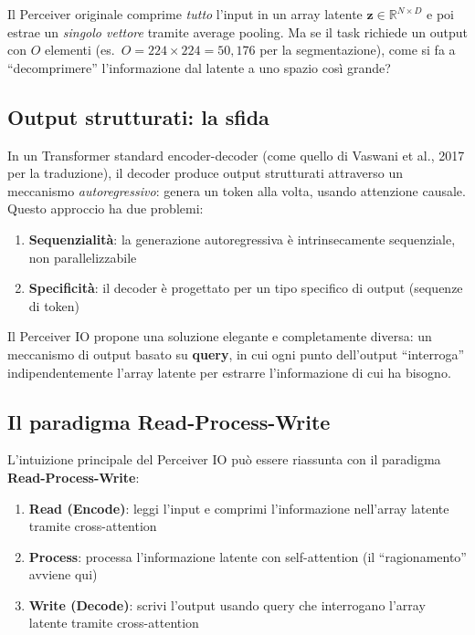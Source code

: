 \documentclass[12pt,a4paper]{article}
\begin{document}
\begin{notabox}
Il Perceiver originale comprime \emph{tutto} l'input in un array latente $\mathbf{z} \in \mathbb{R}^{N \times D}$ e poi estrae un \emph{singolo vettore} tramite average pooling. Ma se il task richiede un output con $O$ elementi (es.\ $O = 224 \times 224 = 50{,}176$ per la segmentazione), come si fa a ``decomprimere'' l'informazione dal latente a uno spazio cos\`i grande?
\end{notabox}

\subsection{Output strutturati: la sfida}

In un Transformer standard encoder-decoder (come quello di Vaswani et al., 2017 per la traduzione), il decoder produce output strutturati attraverso un meccanismo \emph{autoregressivo}: genera un token alla volta, usando attenzione causale. Questo approccio ha due problemi:

\begin{enumerate}
    \item \textbf{Sequenzialit\`a}: la generazione autoregressiva \`e intrinsecamente sequenziale, non parallelizzabile
    \item \textbf{Specificit\`a}: il decoder \`e progettato per un tipo specifico di output (sequenze di token)
\end{enumerate}

Il Perceiver IO propone una soluzione elegante e completamente diversa: un meccanismo di output basato su \textbf{query}, in cui ogni punto dell'output ``interroga'' indipendentemente l'array latente per estrarre l'informazione di cui ha bisogno.

\subsection{Il paradigma Read-Process-Write}

L'intuizione principale del Perceiver IO pu\`o essere riassunta con il paradigma \textbf{Read-Process-Write}:

\begin{enumerate}
    \item \textbf{Read (Encode)}: leggi l'input e comprimi l'informazione nell'array latente tramite cross-attention
    \item \textbf{Process}: processa l'informazione latente con self-attention (il ``ragionamento'' avviene qui)
    \item \textbf{Write (Decode)}: scrivi l'output usando query che interrogano l'array latente tramite cross-attention
\end{enumerate}
\end{document}
